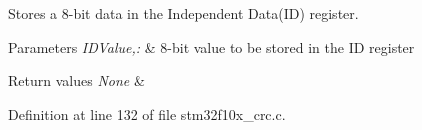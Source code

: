 Stores a 8-\/bit data in the Independent Data(\-I\-D) register. 


\begin{DoxyParams}{Parameters}
{\em I\-D\-Value,\-:} & 8-\/bit value to be stored in the I\-D register \\
\hline
\end{DoxyParams}

\begin{DoxyRetVals}{Return values}
{\em None} & \\
\hline
\end{DoxyRetVals}


Definition at line 132 of file stm32f10x\-\_\-crc.\-c.


